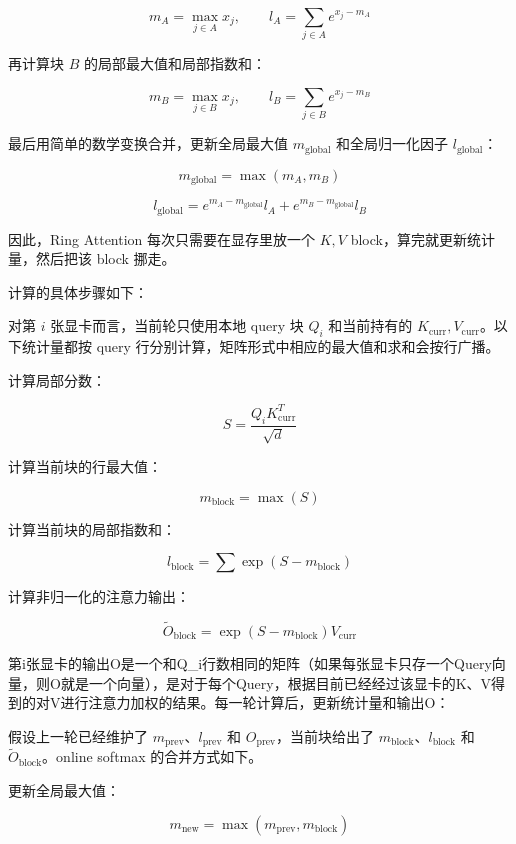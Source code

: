 \[
m_A = \max_{j \in A} x_j,\qquad
l_A = \sum_{j \in A} e^{x_j - m_A}
\]

再计算块 \(B\) 的局部最大值和局部指数和：

\[
m_B = \max_{j \in B} x_j,\qquad
l_B = \sum_{j \in B} e^{x_j - m_B}
\]

最后用简单的数学变换合并，更新全局最大值 \(m_{\mathrm{global}}\) 和全局归一化因子 \(l_{\mathrm{global}}\)：

\[
m_{\mathrm{global}} = \max(m_A, m_B)
\]

\[
l_{\mathrm{global}} =
e^{m_A - m_{\mathrm{global}}} l_A
+ e^{m_B - m_{\mathrm{global}}} l_B
\]

因此，Ring Attention 每次只需要在显存里放一个 \(K, V\) block，算完就更新统计量，然后把该 block 挪走。

计算的具体步骤如下：

对第 \(i\) 张显卡而言，当前轮只使用本地 query 块 \(Q_i\) 和当前持有的 \(K_{\mathrm{curr}}, V_{\mathrm{curr}}\)。以下统计量都按 query 行分别计算，矩阵形式中相应的最大值和求和会按行广播。

计算局部分数：

\[
S = \frac{Q_i K_{\mathrm{curr}}^T}{\sqrt{d}}
\]

计算当前块的行最大值：

\[
m_{\mathrm{block}} = \max(S)
\]

计算当前块的局部指数和：

\[
l_{\mathrm{block}} = \sum \exp(S - m_{\mathrm{block}})
\]

计算非归一化的注意力输出：

\[
\tilde O_{\mathrm{block}} = \exp(S - m_{\mathrm{block}}) V_{\mathrm{curr}}
\]

第i张显卡的输出O是一个和Q\_i行数相同的矩阵（如果每张显卡只存一个Query向量，则O就是一个向量），是对于每个Query，根据目前已经经过该显卡的K、V得到的对V进行注意力加权的结果。每一轮计算后，更新统计量和输出O：

假设上一轮已经维护了 \(m_{\mathrm{prev}}\)、\(l_{\mathrm{prev}}\) 和 \(O_{\mathrm{prev}}\)，当前块给出了 \(m_{\mathrm{block}}\)、\(l_{\mathrm{block}}\) 和 \(\tilde O_{\mathrm{block}}\)。online softmax 的合并方式如下。

更新全局最大值：

\[
m_{\mathrm{new}} = \max(m_{\mathrm{prev}}, m_{\mathrm{block}})
\]

